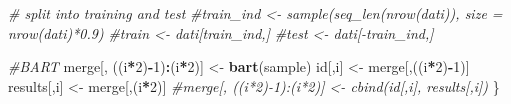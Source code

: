 \documentclass[]{article}
\newenvironment{Shaded}{\begin{snugshade}}{\end{snugshade}}
\newcommand{\CommentTok}[1]{\textcolor[rgb]{0.56,0.35,0.01}{\textit{#1}}}
\newcommand{\DecValTok}[1]{\textcolor[rgb]{0.00,0.00,0.81}{#1}}
\newcommand{\KeywordTok}[1]{\textcolor[rgb]{0.13,0.29,0.53}{\textbf{#1}}}
\newcommand{\NormalTok}[1]{#1}
\newcommand{\OperatorTok}[1]{\textcolor[rgb]{0.81,0.36,0.00}{\textbf{#1}}}
\newcommand{\StringTok}[1]{\textcolor[rgb]{0.31,0.60,0.02}{#1}}
\begin{document}
\begin{Shaded}
\begin{Highlighting}[]
  \CommentTok{# split into training and test }
  \CommentTok{#train_ind <- sample(seq_len(nrow(dati)), size = nrow(dati)*0.9) }
  \CommentTok{#train <- dati[train_ind,]}
  \CommentTok{#test <-  dati[-train_ind,]}
  
  \CommentTok{#BART}
\NormalTok{  merge[, ((i}\OperatorTok{*}\DecValTok{2}\NormalTok{)}\OperatorTok{-}\DecValTok{1}\NormalTok{)}\OperatorTok{:}\NormalTok{(i}\OperatorTok{*}\DecValTok{2}\NormalTok{)] <-}\StringTok{ }\KeywordTok{bart}\NormalTok{(sample)}
\NormalTok{  id[,i]  <-}\StringTok{ }\NormalTok{merge[,((i}\OperatorTok{*}\DecValTok{2}\NormalTok{)}\OperatorTok{-}\DecValTok{1}\NormalTok{)]}
\NormalTok{  results[,i] <-}\StringTok{ }\NormalTok{merge[,(i}\OperatorTok{*}\DecValTok{2}\NormalTok{)]}
  \CommentTok{#merge[, ((i*2)-1):(i*2)] <- cbind(id[,i], results[,i])}
\NormalTok{\}}
\end{Highlighting}
\end{Shaded}
\end{document}
